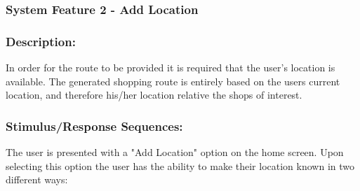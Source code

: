\documentclass[10pt,twocolumn]{witseiepaper}
\begin{document}
		
		\subsubsection{System Feature 2 - Add Location}
		
		\subsubsection*{Description:}
		
		In order for the route to be provided it is required that the user's location is available. The generated shopping route is entirely based on the users current location, and therefore his/her location relative the shops of interest. 
		
		\subsubsection*{Stimulus/Response Sequences:}
		
		The user is presented with a "Add Location" option on the home screen. Upon selecting this option the user has the ability to make their location known in two different ways:
		
\end{document}
